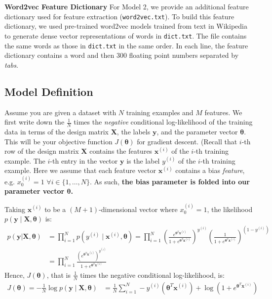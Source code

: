 \documentclass[11pt,addpoints,answers]{exam}
\newcommand{\xv}{\mathbf{x}}
\newcommand{\yv}{\mathbf{y}}
\newcommand{\Xv}{\mathbf{X}}
\newcommand{\thetav     }{\boldsymbol \theta     }
\begin{document}
{\bf Word2vec Feature Dictionary } For Model 2, we provide an additional feature dictionary used for feature extraction (\texttt{word2vec.txt}). To build this feature dictionary, we used pre-trained word2vec models trained from text in Wikipedia to generate dense vector representations of words in \texttt{dict.txt}. The file contains the same words as those in \texttt{dict.txt} in the same order. In each line, the feature dictionary contains a word and then 300 floating point numbers separated by \emph{tabs}.
 
\subsection{Model Definition}\label{modeldescript}
 
 Assume you are given a dataset with $N$ training examples and $M$ features. We first write down the $\frac{1}{N}$ times the \emph{negative} conditional log-likelihood of the training data in terms of the design matrix $\Xv$, the labels $\yv$, and the parameter vector $\thetav$. This will be your objective function $J(\thetav)$ for gradient descent. 
%
(Recall that $i$-th row of the design matrix $\Xv$ contains the features $\xv^{(i)}$ of the $i$-th training example. The $i$-th entry in the vector $\yv$ is the label $y^{(i)}$ of the $i$-th training example.  Here we assume that each feature vector $\xv^{(i)}$ contains a bias \emph{feature}, e.g. $x_0^{(i)} = 1 \,\,\forall i \in \{1,\ldots,N\}$. As such, \textbf{the bias parameter is folded into our parameter vector $\thetav$.}


Taking $\xv^{\left(i\right)}$ to be a $(M+1)$-dimensional vector where $x^{(i)}_0=1$, the likelihood $p\left(\yv \mid \mathbf{X},\thetav\right)$ is:
\begin{align}
     p(\yv |\mathbf{X},\thetav) &= \prod_{i = 1}^N p(y^{(i)} \mid  \xv^{(i)}, \thetav) = \prod_{i = 1}^N \left(\frac{e^{\thetav^T\xv^{\left(i\right)}}}{1+e^{\thetav^T\xv^{\left(i\right)}}}\right)^{y^{(i)}}\left(\frac{1}{1+e^{\thetav^T\xv^{\left(i\right)}}}\right)^{\left(1-y^{(i)}\right)}\\
    &= \prod_{i=1}^N \frac{\left(e^{\thetav^T\xv^{\left(i\right)}}\right)^{y^{(i)}}}{1+e^{\thetav^T\xv^{\left(i\right)}}}
\end{align}
Hence, $J(\thetav)$, that is $\frac{1}{N}$ times the negative conditional log-likelihood, is:
\begin{align}
    J(\thetav)= - \frac{1}{N} \log p\left(\yv \mid \mathbf{X},\thetav\right) &= \frac{1}{N}\sum_{i=1}^N  -y^{(i)}\left(\thetav^T\xv^{\left(i\right)}\right)+\log\left(1+e^{\thetav^T\xv^{\left(i\right)}}\right)
\end{align}
\end{document}
